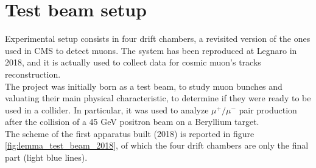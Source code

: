 \documentclass[a4paper,11pt]{book}
\begin{document}
\section{Test beam setup}
Experimental setup consists in four drift chambers, a revisited version of the ones used in CMS to detect muons. The system has been reproduced at Legnaro in 2018, and it is actually used to collect data for cosmic muon's tracks reconstruction.\\
The project was initially born as a test beam, to study muon bunches and valuating their main physical characteristic, to determine if they were ready to be used in a collider. In particular, it was used to analyze $\mu^+/\mu^-$  pair production after the collision of a 45 GeV positron beam on a Beryllium target.\\
The scheme of the first apparatus built (2018) is reported in figure \ref{fig:lemma_test_beam_2018}, of which the four drift chambers are only the final part (light blue lines).\\
\end{document}
